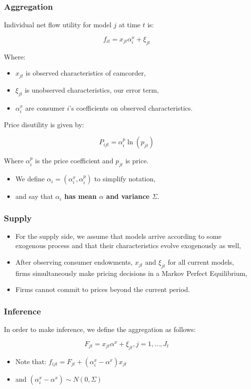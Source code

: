 \documentclass{beamer}
\theoremstyle{definition}
\begin{document}
\begin{frame}
  \frametitle{Aggregation}

  Individual net flow utility for model $j$ at time $t$ is:

  \[f_{it} = x_{jt} \alpha_i^x + \xi_{jt}\]

  Where:
  \begin{itemize}
    \item $ x_{jt}$ is observed characteristics of camcorder,
    \item $\xi_{jt}$ is unobserved characteristics, our error term,
    \item $\alpha_i^x$ are consumer $i$'s coefficients on observed characteristics.
  \end{itemize}
\end{frame}

\begin{frame}

  Price disutility is given by:
  
  \[ P_{ijt} = \alpha^p_i \ln(p_{jt}) \]

  Where $\alpha^p_i$ is the price coefficient and $p_{jt}$ is price.

  \begin{itemize}
    \item We define $\alpha_i = (\alpha^x_i, \alpha^p_i)$ to simplify notation,
    \item and say that \textbf{$\alpha_i$ has mean $\alpha$ and variance
        $\Sigma$}.
  \end{itemize}
\end{frame}

\begin{frame}
  \frametitle{Supply}

  \begin{itemize}
    \item For the supply side, we assume that models arrive according to some
      exogenous process and that their characteristics evolve exogenously as well,
    \item After observing consumer endowments, $x_{jt}$ and $\xi_{jt}$ for all
      current models, firms simultaneously make pricing decisions in a Markov
      Perfect Equilibrium,
    \item Firms cannot commit to prices beyond the current period.
  \end{itemize}
\end{frame}

\begin{frame}
  \frametitle{Inference}

  In order to make inference, we define the aggregation as follows:

  \[
    F_{jt} = x_{jt}\alpha^x + \xi_{jt}, j = 1, \ldots, J_t
  \]

  \begin{itemize}
    \item Note that: $f_{ijt} = F_{jt} + (\alpha_i^x - \alpha^x)x_{jt}$
    \item and $(\alpha_i^x - \alpha^x) \sim N(0, \Sigma)$
  \end{itemize}

\end{frame}
\end{document}
